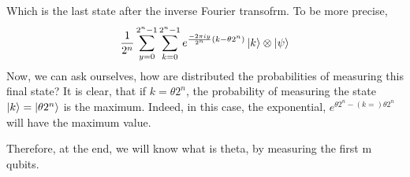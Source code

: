 Which is the last state after the inverse Fourier transofrm. To be more precise, 
\begin{gather}
  \frac{1}{2^n} \sum_{y=0}^{2^n-1}\sum_{k=0}^{2^n-1} e^{\frac{-2\pi iy}{2^n}(k - \theta 2^n)} \ket{k} \otimes \ket{\psi}
\end{gather}
Now, we can ask ourselves, how are distributed the probabilities of measuring this final state? 
It is clear, that if $k=\theta 2^n$, the probability of measuring the state $\ket{k} = \ket{\theta 2^{n}}$ is the maximum. Indeed, in this case, 
the exponential, $e^{\theta 2^n - (k=)\theta 2^n}$ will have the maximum value. 

Therefore, at the end, we will know what is theta, by measuring the first m qubits.
















